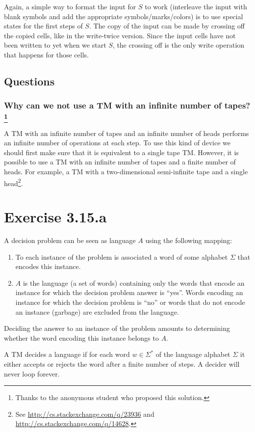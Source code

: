 \documentclass{article}
\newcommand{\0}{\texttt{\textvisiblespace}}
\newcommand{\°}{\obullet{\0}}
\newcommand{\TM}{TM}
\begin{document}
Again, a simple way to format the input for \(S\) to work
(interleave the input with blank symbols and add the
appropriate symbols/marks/colors) is to use special states for the
first steps of \(S\). The copy of the input can be made by crossing off the copied
cells, like in the write-twice version. Since the input cells have not been
written to yet when we start \(S\), the crossing off is the only write
operation that happens for those cells.


\subsection{Questions}
\subsubsection{Why can we not use a \TM{} with an infinite number of
tapes?\footnote{Thanks to the anonymous student who proposed this solution.}}
A \TM{} with an infinite number of tapes and an infinite number of heads
performs an infinite number of operations at each step.
To use this kind of device we should first make sure that it is equivalent to a single
tape \TM{}.
However, it is possible to use a \TM{} with an infinite number of tapes
and a finite number of heads. For example, a \TM{} with a two-dimensional
semi-infinite tape and a single head\footnote{See
\url{http://cs.stackexchange.com/q/23936}
and
\url{http://cs.stackexchange.com/q/14628}.}.

\section{Exercise 3.15.a}
A decision problem can be seen as language \(A\) using the following mapping:
\begin{enumerate}
	\item To each instance of the problem is associated a word of some alphabet
		\(\Sigma\) that encodes this instance.
	\item \(A\) is the language (a set of words) containing only
		the words that encode an instance for
		which the decision problem answer is ``yes''. Words encoding an
		instance for which the decision problem is ``no'' or words that do not
		encode an instance (garbage) are excluded from the language.
\end{enumerate}
Deciding the answer to an instance of the problem amounts to determining
whether the word encoding this instance belongs to \(A\).

A \TM{} decides a language if for each word \(w \in \Sigma^{*}\)
of the language alphabet \(\Sigma\)
it either accepts or rejects the word after a finite number of steps. A decider
will never loop forever.
\end{document}
